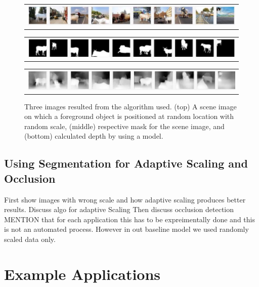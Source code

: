 \documentclass[review]{cvpr}
\begin{document}
\begin{figure}
  \begin{center}
  \begin{tabular}{@{}c@{}}
      \includegraphics[width=0.8\linewidth]{overlay.jpg}
  \end{tabular}
  \begin{tabular}{@{}c@{}}
      \includegraphics[width=0.8\linewidth]{overlaymask.jpg}
  \end{tabular}
  \begin{tabular}{@{}c@{}}
      \includegraphics[width=0.8\linewidth]{overlaydepth.jpg}
  \end{tabular}
  \end{center}
  \caption{Three images resulted from the algorithm used. (top) A scene image on which a foreground object is positioned
   at random location with random scale, (middle) respective mask for the scene image, and (bottom) calculated depth by using a model.}
  \label{fig:finaldataset}
\end{figure}

\subsection{Using Segmentation for Adaptive Scaling and Occlusion}
First show images with wrong scale and how adaptive scaling produces better results. Discuss algo for adaptive Scaling
Then discuss occlusion detection
MENTION that for each application this has to be expreimentally done and this is not an automated process.
However in out baseline model we used randomly scaled data only.

\section{Example Applications}
\end{document}
